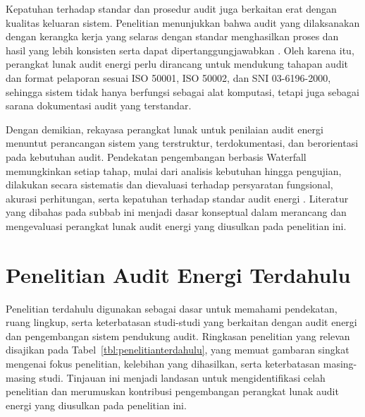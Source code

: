 Kepatuhan terhadap standar dan prosedur audit juga berkaitan erat dengan kualitas keluaran sistem. Penelitian menunjukkan bahwa audit yang dilaksanakan dengan kerangka kerja yang selaras dengan standar menghasilkan proses dan hasil yang lebih konsisten serta dapat dipertanggungjawabkan \cite{owusuafriyiea2024monitoring}. Oleh karena itu, perangkat lunak audit energi perlu dirancang untuk mendukung tahapan audit dan format pelaporan sesuai ISO 50001, ISO 50002, dan SNI 03-6196-2000, sehingga sistem tidak hanya berfungsi sebagai alat komputasi, tetapi juga sebagai sarana dokumentasi audit yang terstandar.

Dengan demikian, rekayasa perangkat lunak untuk penilaian audit energi menuntut perancangan sistem yang terstruktur, terdokumentasi, dan berorientasi pada kebutuhan audit. Pendekatan pengembangan berbasis Waterfall memungkinkan setiap tahap, mulai dari analisis kebutuhan hingga pengujian, dilakukan secara sistematis dan dievaluasi terhadap persyaratan fungsional, akurasi perhitungan, serta kepatuhan terhadap standar audit energi \cite{sommerville2016software}. Literatur yang dibahas pada subbab ini menjadi dasar konseptual dalam merancang dan mengevaluasi perangkat lunak audit energi yang diusulkan pada penelitian ini.

\section{Penelitian Audit Energi Terdahulu}
Penelitian terdahulu digunakan sebagai dasar untuk memahami pendekatan, ruang lingkup, serta keterbatasan studi-studi yang berkaitan dengan audit energi dan pengembangan sistem pendukung audit. Ringkasan penelitian yang relevan disajikan pada Tabel~\ref{tbl:penelitianterdahulu}, yang memuat gambaran singkat mengenai fokus penelitian, kelebihan yang dihasilkan, serta keterbatasan masing-masing studi. Tinjauan ini menjadi landasan untuk mengidentifikasi celah penelitian dan merumuskan kontribusi pengembangan perangkat lunak audit energi yang diusulkan pada penelitian ini.




